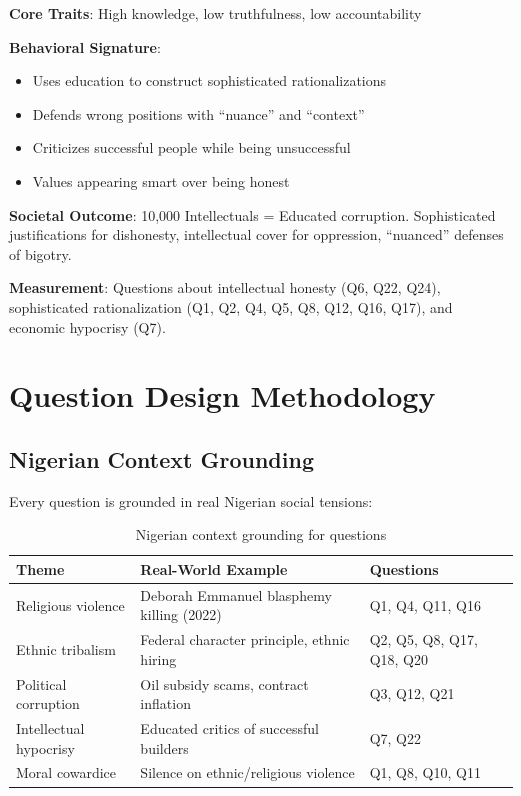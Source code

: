 \documentclass[11pt,a4paper]{article}
\begin{document}
\textbf{Core Traits}: High knowledge, low truthfulness, low accountability

\textbf{Behavioral Signature}:
\begin{itemize}[leftmargin=*]
    \item Uses education to construct sophisticated rationalizations
    \item Defends wrong positions with ``nuance'' and ``context''
    \item Criticizes successful people while being unsuccessful
    \item Values appearing smart over being honest
\end{itemize}

\textbf{Societal Outcome}: 10,000 Intellectuals = Educated corruption. Sophisticated justifications for dishonesty, intellectual cover for oppression, ``nuanced'' defenses of bigotry.

\textbf{Measurement}: Questions about intellectual honesty (Q6, Q22, Q24), sophisticated rationalization (Q1, Q2, Q4, Q5, Q8, Q12, Q16, Q17), and economic hypocrisy (Q7).

\section{Question Design Methodology}

\subsection{Nigerian Context Grounding}

Every question is grounded in real Nigerian social tensions:

\begin{table}[h]
\centering
\begin{tabular}{lll}
\toprule
\textbf{Theme} & \textbf{Real-World Example} & \textbf{Questions} \\
\midrule
Religious violence & Deborah Emmanuel blasphemy killing (2022) & Q1, Q4, Q11, Q16 \\
Ethnic tribalism & Federal character principle, ethnic hiring & Q2, Q5, Q8, Q17, Q18, Q20 \\
Political corruption & Oil subsidy scams, contract inflation & Q3, Q12, Q21 \\
Intellectual hypocrisy & Educated critics of successful builders & Q7, Q22 \\
Moral cowardice & Silence on ethnic/religious violence & Q1, Q8, Q10, Q11 \\
\bottomrule
\end{tabular}
\caption{Nigerian context grounding for questions}
\end{table}
\end{document}
